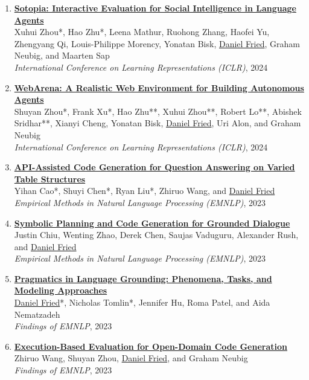 \begin{enumerate}[leftmargin=-1mm,partopsep=0pt]
\item \href{http://arxiv.org/abs/2310.11667}{\textbf{Sotopia: Interactive Evaluation for Social Intelligence in Language Agents}} \\
  Xuhui Zhou*, Hao Zhu*, Leena Mathur, Ruohong Zhang, Haofei Yu, Zhengyang Qi, Louis-Philippe Morency, Yonatan Bisk, \underline{Daniel Fried}, Graham Neubig, and Maarten Sap\\
  \emph{International Conference on Learning Representations (ICLR)}, 2024

\item \href{https://arxiv.org/abs/2307.13854}{\textbf{WebArena: A Realistic Web Environment for Building Autonomous Agents}} \\
  Shuyan Zhou*, Frank Xu*, Hao Zhu**, Xuhui Zhou**, Robert Lo**, Abishek Sridhar**, Xianyi Cheng, Yonatan Bisk, \underline{Daniel Fried}, Uri Alon, and Graham Neubig\\
  \emph{International Conference on Learning Representations (ICLR)}, 2024

\item \href{https://arxiv.org/abs/2310.14687}{\textbf{API-Assisted Code Generation for Question Answering on Varied Table Structures}} \\
  Yihan Cao*, Shuyi Chen*, Ryan Liu*, Zhiruo Wang, and \underline{Daniel Fried}\\
  \emph{Empirical Methods in Natural Language Processing (EMNLP)}, 2023

\item \href{https://arxiv.org/abs/2310.17140}{\textbf{Symbolic Planning and Code Generation for Grounded Dialogue }} \\
  Justin Chiu, Wenting Zhao, Derek Chen, Saujas Vaduguru, Alexander Rush, and \underline{Daniel Fried}\\
  \emph{Empirical Methods in Natural Language Processing (EMNLP)}, 2023

\item \href{https://arxiv.org/abs/2211.08371}{\textbf{Pragmatics in Language Grounding: Phenomena, Tasks, and Modeling Approaches}} \\
  \underline{Daniel Fried}*, Nicholas Tomlin*, Jennifer Hu, Roma Patel, and Aida Nematzadeh\\
  \emph{Findings of EMNLP}, 2023

\item \href{https://arxiv.org/abs/2212.10481}{\textbf{Execution-Based Evaluation for Open-Domain Code Generation}} \\
  Zhiruo Wang, Shuyan Zhou, \underline{Daniel Fried}, and Graham Neubig\\
  \emph{Findings of EMNLP}, 2023


\end{enumerate}
